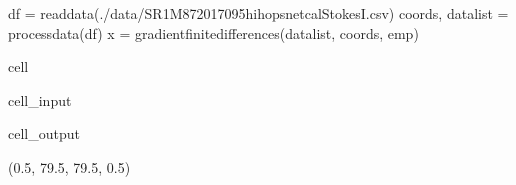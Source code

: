 \documentclass[letterpaper,10pt,english]{jupyterBook}
\begin{document}
\begin{sphinxVerbatim}[commandchars=\\\{\}]
df = read\PYGZus{}data(\PYGZdq{}./data/SR1\PYGZus{}M87\PYGZus{}2017\PYGZus{}095\PYGZus{}hi\PYGZus{}hops\PYGZus{}netcal\PYGZus{}StokesI.csv\PYGZdq{})
coords, data\PYGZus{}list = process\PYGZus{}data(df)
x = gradient\PYGZus{}finite\PYGZus{}differences(data\PYGZus{}list, coords, emp)
\end{sphinxVerbatim}

\begin{sphinxuseclass}{cell}\begin{sphinxVerbatimInput}

\begin{sphinxuseclass}{cell_input}
\begin{sphinxVerbatim}[commandchars=\\\{\}]
    
\end{sphinxVerbatim}

\end{sphinxuseclass}\end{sphinxVerbatimInput}
\begin{sphinxVerbatimOutput}

\begin{sphinxuseclass}{cell_output}
\begin{sphinxVerbatim}[commandchars=\\\{\}]
(\PYGZhy{}0.5, 79.5, 79.5, \PYGZhy{}0.5)
\end{sphinxVerbatim}

\noindent{}

\end{sphinxuseclass}\end{sphinxVerbatimOutput}

\end{sphinxuseclass}
\sphinxstepscope
\end{document}
